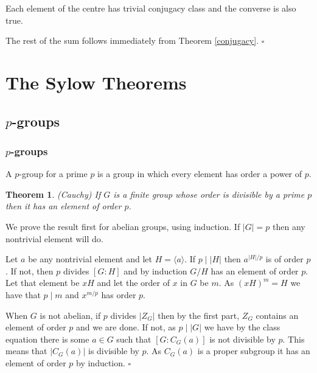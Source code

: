 \documentclass[10pt]{article}
\newtheorem{theorem}{Theorem}[section]
\newenvironment{proof}[1][Proof]{\begin{trivlist}
\item[\hskip \labelsep {\itshape #1}]}{\end{trivlist}}
\newenvironment{definition}[1][Definition]{\begin{trivlist}
\item[\hskip \labelsep {\bfseries #1}]}{\end{trivlist}}
\begin{document}
\begin{proof}
Each element of the centre has trivial conjugacy class and the converse is also true.

The rest of the sum follows immediately from Theorem \ref{conjugacy}. $\square$
\end{proof}

\section{The Sylow Theorems}

\subsection{$p$-groups}

\subsubsection{$p$-groups}

\begin{definition}
A $p$-group for a prime $p$ is a group in which every element has order a power of $p$.
\end{definition}

\begin{theorem} (Cauchy)
If $G$ is a finite group whose order is divisible by a prime $p$ then it has an element of order $p$.
\end{theorem}

\begin{proof}
We prove the result first for abelian groups, using induction. If $|G| = p$ then any nontrivial element will do.

Let $a$ be any nontrivial element and let $H = \langle a \rangle$. If $p \;|\; |H|$ then $a^{|H|/p}$ is of order $p$. If not, then $p$ divides $[G:H]$ and by induction $G/H$ has an element of order $p$. Let that element be $xH$ and let the order of $x$ in $G$ be $m$. As $(xH)^m = H$ we have that $p \;|\; m$ and $x^{m/p}$ has order $p$.

When $G$ is not abelian, if $p$ divides $|Z_G|$ then by the first part, $Z_G$ contains an element of order $p$ and we are done. If not, as $p \;|\; |G|$ we have by the class equation there is some $a \in G$ such that $[G:C_G(a)]$ is not divisible by $p$. This means that $|C_G(a)|$ is divisible by $p$. As $C_G(a)$ is a proper subgroup it has an element of order $p$ by induction. $\square$
\end{proof}
\end{document}
